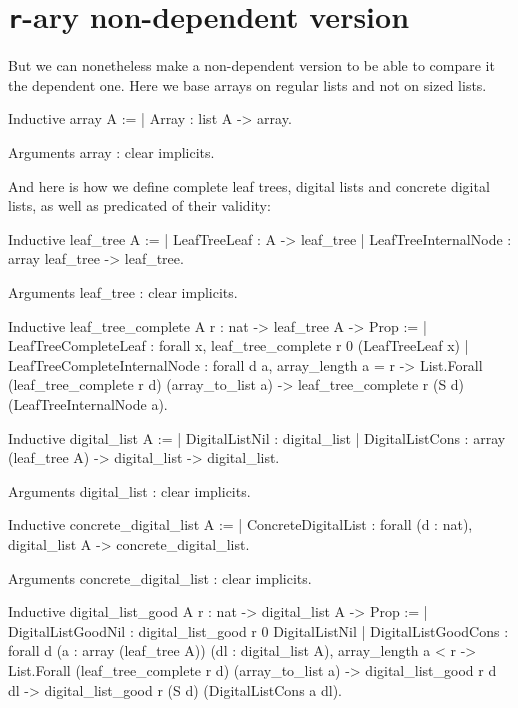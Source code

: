 \documentclass{article}
\begin{document}
\section{\texttt{r}-ary non-dependent version}

But we can nonetheless make a non-dependent version to be able to compare it the dependent one. Here we base arrays on regular lists and not on sized lists.

\begin{coq}
Inductive array {A} :=
  | Array : list A -> array.

Arguments array : clear implicits.
\end{coq}

And here is how we define complete leaf trees, digital lists and concrete digital lists, as well as predicated of their validity:

\vspace{0.5cm}%

\begin{coq}
Inductive leaf_tree {A} :=
  | LeafTreeLeaf : A -> leaf_tree
  | LeafTreeInternalNode : array leaf_tree -> leaf_tree.

Arguments leaf_tree : clear implicits.

Inductive leaf_tree_complete {A} r : nat -> leaf_tree A -> Prop :=
  | LeafTreeCompleteLeaf : forall x, leaf_tree_complete r 0 (LeafTreeLeaf x)
  | LeafTreeCompleteInternalNode :
      forall {d} a,
      array_length a = r ->
      List.Forall (leaf_tree_complete r d) (array_to_list a) ->
      leaf_tree_complete r (S d) (LeafTreeInternalNode a).

Inductive digital_list {A} :=
  | DigitalListNil : digital_list
  | DigitalListCons : array (leaf_tree A) -> digital_list -> digital_list.

Arguments digital_list : clear implicits.

Inductive concrete_digital_list {A} :=
  | ConcreteDigitalList : forall (d : nat), digital_list A -> concrete_digital_list.

Arguments concrete_digital_list : clear implicits.

Inductive digital_list_good {A} r : nat -> digital_list A -> Prop :=
  | DigitalListGoodNil : digital_list_good r 0 DigitalListNil
  | DigitalListGoodCons :
      forall {d} (a : array (leaf_tree A)) (dl : digital_list A),
      array_length a < r ->
      List.Forall (leaf_tree_complete r d) (array_to_list a) ->
      digital_list_good r d dl ->
      digital_list_good r (S d) (DigitalListCons a dl).
\end{coq}
\end{document}
